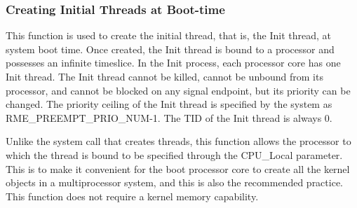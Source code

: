 \subsubsection{Creating Initial Threads at Boot-time}\label{subsubsec:7-create-initial-thread-at-boot}

This function is used to create the initial thread, that is, the Init thread, at system boot time. Once created, the Init thread is bound to a processor and possesses an infinite timeslice. In the Init process, each processor core has one Init thread. The Init thread cannot be killed, cannot be unbound from its processor, and cannot be blocked on any signal endpoint, but its priority can be changed. The priority ceiling of the Init thread is specified by the system as RME\_PREEMPT\_PRIO\_NUM-1. The TID of the Init thread is always 0.

Unlike the system call that creates threads, this function allows the processor to which the thread is bound to be specified through the CPU\_Local parameter. This is to make it convenient for the boot processor core to create all the kernel objects in a multiprocessor system, and this is also the recommended practice. This function does not require a kernel memory capability.

